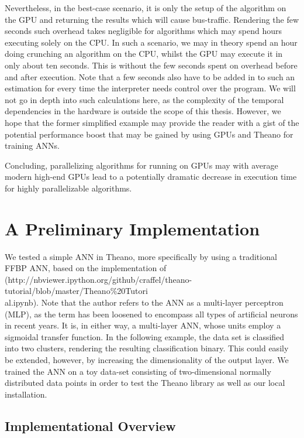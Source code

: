 Nevertheless, in the best-case scenario, it is only the setup of the algorithm on the GPU and returning the results which will cause bus-traffic. Rendering the few seconds such overhead takes negligible for algorithms which may spend hours executing solely on the CPU. In such a scenario, we may in theory spend an hour doing crunching an algorithm on the CPU, whilst the GPU may execute it in only about ten seconds. This is without the few seconds spent on overhead before and after execution. Note that a few seconds also have to be added in to such an estimation for every time the interpreter needs control over the program. We will not go in depth into such calculations here, as the complexity of the temporal dependencies in the hardware is outside the scope of this thesis. However, we hope that the former simplified example may provide the reader with a gist of the potential performance boost that may be gained by using GPUs and Theano for training ANNs.

Concluding, parallelizing algorithms for running on GPUs may with average modern high-end GPUs lead to a potentially dramatic decrease in execution time for highly parallelizable algorithms.

\section{A Preliminary Implementation}\label{preliminary_example}

We tested a simple ANN in Theano, more specifically by using a traditional FFBP ANN, based on the implementation of
\\(http://nbviewer.ipython.org/github/craffel/theano-tutorial/blob/master/Theano\%20Tutori
\\al.ipynb). Note that the author refers to the ANN as a multi-layer perceptron (MLP), as the term has been loosened to encompass all types of artificial neurons in recent years. It is, in either way, a multi-layer ANN, whose units employ a sigmoidal transfer function. In the following example, the data set is classified into two clusters, rendering the resulting classification binary. This could easily be extended, however, by increasing the dimensionality of the output layer. We trained the ANN on a toy data-set consisting of two-dimensional normally distributed data points in order to test the Theano library as well as our local installation.


\subsection{Implementational Overview}

